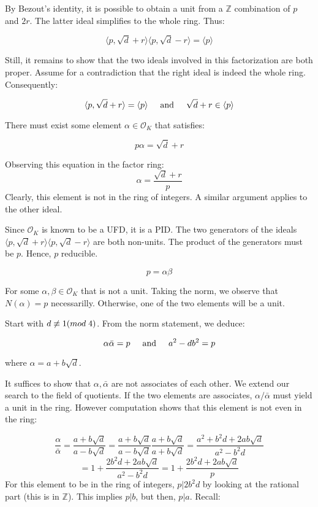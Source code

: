 \documentclass{article}
\def\ZZ{{\mathbb{Z}}}
\def\_{{\hspace{1mm}}}
\newcommand{\textAnd}{
    \hspace{5mm}
    \textrm{and}
    \hspace{5mm}
}
\newcommand{\<}{{{
    \langle
}}}
\def\>{{{
    \rangle
}}}
\def\ZZ{{\mathbb{Z}}}
\newcommand{\ringInt}{
    {\mathcal{O}}
}
\begin{document}
By Bezout's identity, it is possible to obtain a unit from 
a $\ZZ$ combination of $p$ and $2r$. The latter ideal simplifies 
to the whole ring. Thus:

\[
    \<p, \sqrt{d} + r\>\<p, \sqrt{d} - r\>
    = \<p\>
\]

Still, it remains to show that the two ideals involved in this 
factorization are both proper. Assume for a contradiction that 
the right ideal is indeed the whole ring. Consequently:

\[
    \<p, \sqrt{d}+r\> = \<p\> \textAnd 
    \sqrt{d}+r \in \<p\>
\]

There must exist some element $\alpha \in \ringInt_K$ that satisfies:

\[
   p\alpha = \sqrt{d}+r
\]

Observing this equation in the factor ring:
\[
    \alpha = \frac{\sqrt{d}+r}{p}
\]
Clearly, this element is not in the ring of integers. A similar 
argument applies to the other ideal. 

Since $\ringInt_K$ is known to be a UFD, it is a PID. The two 
generators of the ideals $\<p, \sqrt{d} + r\>\<p, \sqrt{d} - r\>$
are both non-units. The product of the generators must be $p$. 
Hence, $p$ reducible. 

\[
    p = \alpha \beta
\]

For some $\alpha, \beta \in \ringInt_K$ that is not a unit. 
Taking the norm, we observe that $N(\alpha) = p$ necessarilly. 
Otherwise, one of the two elements will be a unit. 

Start with $d \not\equiv 1(mod\_4)$. 
From the norm 
statement, we deduce:

\[
    \alpha \bar{\alpha} = p
    \textAnd 
    a^2-db^2 = p
\]

where $\alpha = a+b\sqrt{d}$. 

It suffices to show that $\alpha, \bar{\alpha}$ are not 
associates of each other. We extend our search to the field of 
quotients. If the two elements are associates, 
$\alpha / \bar{\alpha}$ must yield a unit in the ring. However 
computation shows that this element is not even in the ring:

\[
    \frac{\alpha}{\bar{\alpha}}
    = \frac{a+b\sqrt{d}}{a-b\sqrt{d}}   
    = \frac{a+b\sqrt{d}}{a-b\sqrt{d}}   
    \frac{a+b\sqrt{d}}{a+b\sqrt{d}}
    =
    \frac{a^2+b^2d+2ab\sqrt{d}}{a^2-b^2d}
\]
\[
    = 1+\frac{2b^2d+2ab\sqrt{d}}{a^2-b^2d}
    = 1+\frac{2b^2d+2ab\sqrt{d}}{p}
\]
For this element to be in the ring of integers, 
$p|2b^2d$ by looking at the rational part (this is in $\ZZ$). 
This implies $p|b$, but then, $p|a$. Recall:
\end{document}
